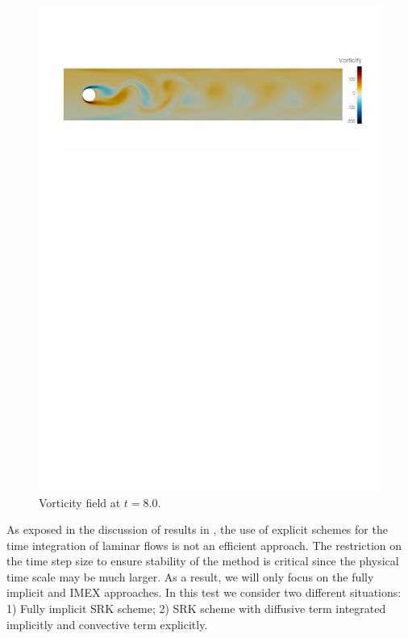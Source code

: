 \begin{figure}[h!]
  \centering
  \includegraphics[clip=true,trim=1.5cm 22.5cm 1cm 3cm,width=\textwidth]{Figures/Chapter6/cylinder/vorticity}
  \caption{Vorticity field at $t=8.0$.}
  \label{fig:Cyl_vorti}
\end{figure}

As exposed in the discussion of results in \cite{schafer_benchmark_1996}, the use of explicit schemes for the time integration of laminar flows is not an efficient approach. The restriction on the time step size to ensure stability of the method is critical since the physical time scale may be much larger. %
As a result, we will only focus on the fully implicit and IMEX approaches. In this test we consider two different situations: 1) Fully implicit SRK scheme; 2) SRK scheme with diffusive term integrated implicitly and convective term explicitly.

